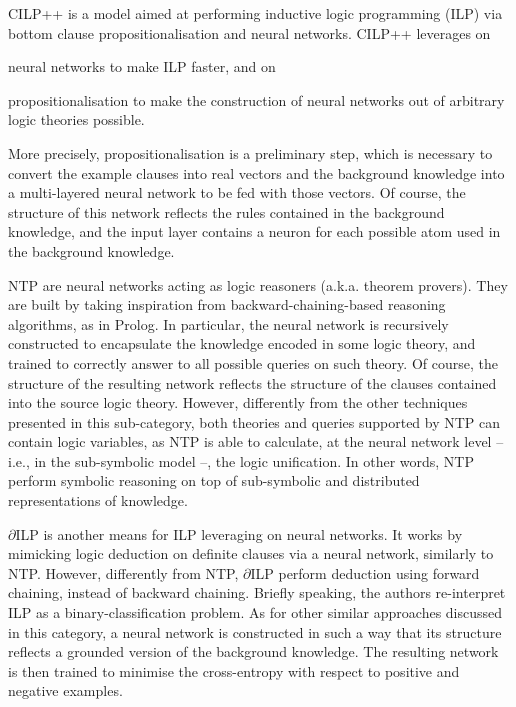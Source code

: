 \documentclass[12pt,a4paper,openright,twoside]{book}
\begin{document}
CILP++ \cite{Franca2014} is a model aimed at performing inductive logic programming (ILP) via bottom clause propositionalisation and neural networks.
%
CILP++ leverages on
%
\begin{inlinelist}
    \item neural networks to make ILP faster, and on
    \item propositionalisation to make the construction of neural networks out of arbitrary logic theories possible.
\end{inlinelist}
%
More precisely, propositionalisation \cite{Lachiche2010} is a preliminary step, which is necessary to convert the example clauses into real vectors and the background knowledge into a multi-layered neural network to be fed with those vectors.
%
Of course, the structure of this network reflects the rules contained in the background knowledge, and the input layer contains a neuron for each possible atom used in the background knowledge.

NTP \cite{rocktaschel2017} are neural networks acting as logic reasoners (a.k.a. theorem provers).
%
They are built by taking inspiration from backward-chaining-based reasoning algorithms, as in Prolog.
%
In particular, the neural network is recursively constructed to encapsulate the knowledge encoded in some logic theory, and trained to correctly answer to all possible queries on such theory.
%
Of course, the structure of the resulting network reflects the structure of the clauses contained into the source logic theory.
%
However, differently from the other techniques presented in this sub-category, both theories and queries supported by NTP can contain logic variables, as NTP is able to calculate, at the neural network level -- i.e., in the sub-symbolic model --, the logic unification.
%
In other words, NTP perform symbolic reasoning on top of sub-symbolic and distributed representations of knowledge.

$\partial$ILP \cite{EvansG18} is another means for ILP  leveraging on neural networks.
%
It works by mimicking logic deduction on definite clauses via a neural network, similarly to NTP.
%
However, differently from NTP, $\partial$ILP perform deduction using forward chaining, instead of backward chaining.
%
Briefly speaking, the authors re-interpret ILP as a binary-classification problem.
%
As for other similar approaches discussed in this category, a neural network is constructed in such a way that its structure reflects a grounded version of the background knowledge.
%
The resulting network is then trained to minimise the cross-entropy with respect to positive and negative examples.
\end{document}
